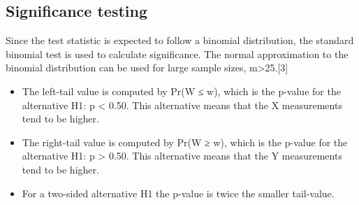 \subsection*{Significance testing}
Since the test statistic is expected to follow a binomial distribution, the standard binomial test is used to calculate significance. The normal approximation to the binomial distribution can be used for large sample sizes, m>25.[3]

\begin{itemize}
\item The left-tail value is computed by Pr(W ≤ w), which is the p-value for the alternative H1: p < 0.50. This alternative means that the X measurements tend to be higher.
\item The right-tail value is computed by Pr(W ≥ w), which is the p-value for the alternative H1: p > 0.50. This alternative means that the Y measurements tend to be higher.
\item For a two-sided alternative H1 the p-value is twice the smaller tail-value.
\end{itemize}

